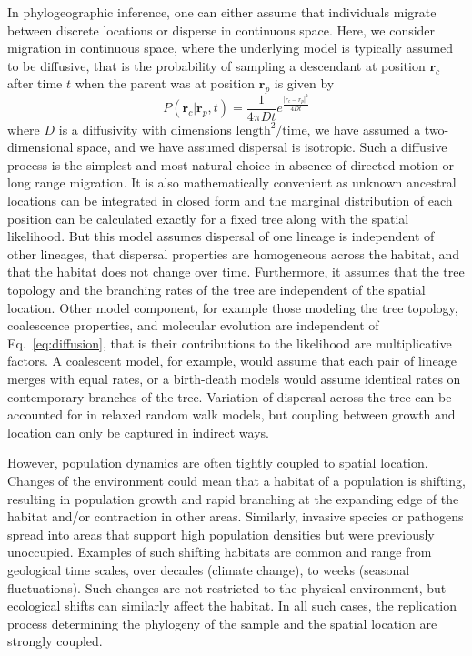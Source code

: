 \documentclass[aps,rmp, twocolumn]{revtex4}
\newcommand{\rvec}{\mathbf{r}}
\begin{document}
In phylogeographic inference, one can either assume that individuals migrate between discrete locations or disperse in continuous space.
Here, we consider migration in continuous space, where the underlying model is typically assumed to be diffusive, that is the probability of sampling a descendant at position $\rvec_c$ after time $t$ when the parent was at position $\rvec_p$ is given by
\begin{equation}
    P(\rvec_c| \rvec_p, t) = \frac{1}{4\pi D t}e^{\frac{|r_c - r_p|^2}{4Dt}}
    \label{eq:diffusion}
\end{equation}
where $D$ is a diffusivity with dimensions $\mathrm{length}^2/\mathrm{time}$, we have assumed a two-dimensional space, and we have assumed dispersal is isotropic.
Such a diffusive process is the simplest and most natural choice in absence of directed motion or long range migration.
It is also mathematically convenient as unknown ancestral locations can be integrated in closed form and the marginal distribution of each position can be calculated exactly for a fixed tree along with the spatial likelihood.
But this model assumes dispersal of one lineage is independent of other lineages, that dispersal properties are homogeneous across the habitat, and that the habitat does not change over time.
Furthermore, it assumes that the tree topology and the branching rates of the tree are independent of the spatial location.
Other model component, for example those modeling the tree topology, coalescence properties, and molecular evolution are independent of Eq.~\ref{eq:diffusion}, that is their contributions to the likelihood are multiplicative factors.
A coalescent model, for example, would assume that each pair of lineage merges with equal rates, or a birth-death models would assume identical rates on contemporary branches of the tree.
Variation of dispersal across the tree can be accounted for in relaxed random walk models, but coupling between growth and location can only be captured in indirect ways.


However, population dynamics are often tightly coupled to spatial location.
Changes of the environment could mean that a habitat of a population is shifting, resulting in population growth and rapid branching at the expanding edge of the habitat and/or contraction in other areas.
Similarly, invasive species or pathogens spread into areas that support high population densities but were previously unoccupied.
Examples of such shifting habitats are common and range from geological time scales, over decades (climate change), to weeks (seasonal fluctuations).
Such changes are not restricted to the physical environment, but ecological shifts can similarly affect the habitat.
In all such cases, the replication process determining the phylogeny of the sample and the spatial location are strongly coupled.
\end{document}

